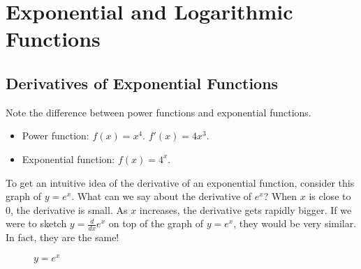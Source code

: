 \section{Exponential and Logarithmic Functions}
\label{sec:explogderiv}

\subsection{Derivatives of Exponential Functions}
Note the difference between power functions and exponential functions.
\begin{itemize}
    \item Power function: $f(x) = x^4$. $f'(x) = 4x^3$.
    \item Exponential function: $f(x) = 4^x$.
    \end{itemize}

To get an intuitive idea of the derivative of an exponential function, consider this graph of $y=e^x$. What can we say about the derivative of $e^x$? When $x$ is close to 0, the derivative is small. As $x$ increases, the derivative gets rapidly bigger. If we were to sketch $y=\frac{d}{dx}e^x$ on top of the graph of $y=e^x$, they would be very similar. In fact, they are the same!

\begin{figure}[ht!]
\centering
{}
\caption{$y=e^x$}
\label{fig:2-8-exp}
\end{figure} 

